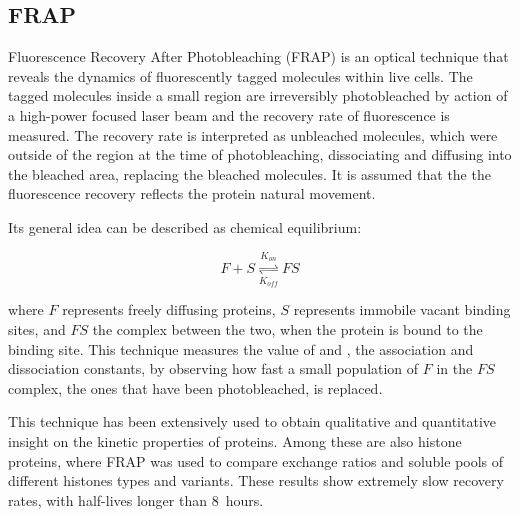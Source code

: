
  \subsection{FRAP}

    Fluorescence Recovery After Photobleaching (FRAP) is an optical technique
    that reveals the dynamics of fluorescently tagged molecules within live cells.
    The tagged molecules inside a small region are irreversibly photobleached by
    action of a high-power focused laser beam and the recovery rate of fluorescence
    is measured. The recovery rate is interpreted as unbleached molecules,
    which were outside of the region at the time of photobleaching, dissociating and
    diffusing into the bleached area, replacing the bleached molecules. It is assumed that the
    the fluorescence recovery reflects the protein natural movement.

    Its general idea can be described as chemical equilibrium:

    \begin{displaymath}
      F + S \overset{K_{on}}{\underset{K_{off}}{\rightleftharpoons}} FS
    \end{displaymath}

    where $F$ represents freely diffusing proteins, $S$ represents immobile vacant
    binding sites, and $FS$ the complex between the two, when the protein is bound
    to the binding site. This technique measures the value of \Kon{} and \Koff{},
    the association and dissociation constants, by observing how fast a
    small population of $F$ in the $FS$ complex, the ones that have been
    photobleached, is replaced.

    This technique has been extensively used to obtain qualitative and quantitative
    insight on the kinetic properties of proteins. Among these are also
    histone proteins, where FRAP was used to compare exchange ratios and
    soluble pools of different histones types and variants. These results
    show extremely slow recovery rates, with half-lives longer than 8~hours.


